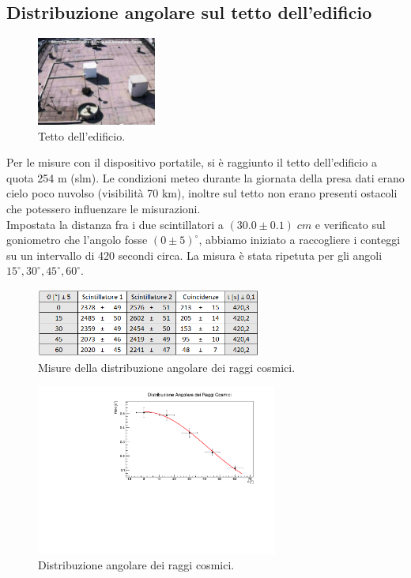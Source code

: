 \documentclass[11pt]{article} %
\begin{document}
\subsection{Distribuzione angolare sul tetto dell'edificio}
\begin{figure}
\vspace{-30pt}
  \begin{center}
    \includegraphics[width=0.35\textwidth]{img/tetto.jpg}
  \end{center}
  \caption{Tetto dell'edificio.}
\end{figure}
Per le misure con il dispositivo portatile,  si è raggiunto il tetto dell'edificio a quota 254 m (slm). Le condizioni meteo durante la giornata della presa dati erano cielo poco nuvolso (visibilità 70 km), inoltre sul tetto non erano presenti ostacoli che potessero influenzare le misurazioni.\\
Impostata la distanza fra i due scintillatori a $\left(30.0\pm0.1\right)\;cm$ e verificato sul goniometro che l'angolo fosse $\left(0\pm5\right)^{\circ}$, abbiamo iniziato a raccogliere i conteggi su un intervallo di 420 secondi circa. La misura è stata ripetuta per gli angoli $15^{\circ},30^{\circ},45^{\circ},60^{\circ}$.
\begin{figure}[h!]
\begin{center}
\includegraphics[width=280px]{img/CB1.PNG}
\caption{Misure della distribuzione angolare dei raggi cosmici.}
\label{fig:CBangle}
\end{center}
\end{figure}
\begin{figure}[h!]
\begin{center}
\includegraphics[width=300px]{img/CBdeg.pdf}
\caption{Distribuzione angolare dei raggi cosmici.}
\label{fig:CBdeg}
\end{center}
\end{figure}
\end{document}
